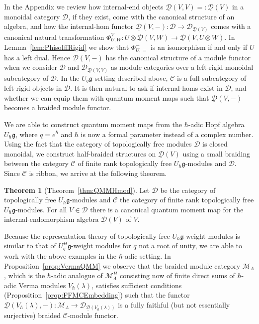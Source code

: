 \documentclass[12pt,dvipsnames]{article}
\numberwithin{equation}{section}
\theoremstyle{definition}
\newtheorem{theorem}[definition]{Theorem}
\newcommand{\cat}[1]{\mathcal{#1}}
\newcommand{\1}{\ensuremath{\mathbbm{1}}}
\newcommand{\blank}{{-}}
\newcommand{\bblank}{{=}}
\begin{document}
In the Appendix we review how internal-end objects $\underline{\cat{D}}(V,V) =: \underline{\cat{D}}(V)$ in a monoidal category $\cat{D}$, if they exist, come with the canonical structure of an algebra, and how the internal-hom functor $\underline{\cat{D}}(V,\blank):\cat{D} \to \cat{D}_{\underline{\cat{D}}(V)}$ comes with a canonical natural transformation $\Phi_{U,W}^V: U\otimes\underline{\cat{D}}(V,W)\to \underline{\cat{D}}(V,U\otimes W)$. In Lemma~\ref{lem:PhisoIffRigid} we show that $\Phi_{U,\bblank}^\blank$ is an isomorphism if and only if $U$ has a left dual. Hence $\underline{\cat{D}}(V,\blank)$ has the canonical structure of a module functor when we consider $\cat{D}$ and $\cat{D}_{\underline{\cat{D}}(V,V)}$ as module categories over a left-rigid monoidal subcategory of $\cat{D}$. In the $U_q\mathfrak{g}$ setting described above, $\cat{C}$ is a full subcategory of left-rigid objects in $\cat{D}$. It is then natural to ask if internal-homs exist in $\cat{D}$, and whether we can equip them with quantum moment maps such that $\underline{\cat{D}}(V,\blank)$ becomes a braided module functor. 

We are able to construct quantum moment maps from the $\hbar$-adic Hopf algebra $U_\hbar\mathfrak{g}$, where $q = e^\hbar$ 
and $\hbar$ is now a formal parameter instead of a complex number. Using the fact that the category of topologically free modules $\cat{D}$ is closed monoidal, we construct half-braided structures on $\underline{\cat{D}}(V)$
using a small braiding between the category $\cat{C}$ of finite rank topologically free $U_\hbar \mathfrak{g}$-modules and $\cat{D}$. Since $\cat{C}$ is ribbon, we arrive at the following theorem.
\begin{theorem}[Theorem~\ref{thm:QMMHmod}]
   Let $\cat{D}$ be the category of topologically free $U_\hbar\mathfrak{g}$-modules and $\cat{C}$ the category of finite rank topologically free $U_\hbar\mathfrak{g}$-modules. For all $V\in\cat{D}$ there is a canonical quantum moment map for the internal-endomorphism algebra $\underline{\cat{D}}(V)$ of $V$.
\end{theorem}
Because the representation theory of topologically free $U_\hbar\mathfrak{g}$-weight modules is similar to that of $U_q^H\mathfrak{g}$-weight modules for $q$ not a root of unity, we are able to work with the above examples in the $\hbar$-adic setting. In Proposition~\ref{prop:VermaQMM} we observe that the braided module category $\cat{M}_\Lambda$, which is the $\hbar$-adic analogue of $\cat{M}_\Lambda^H$ consisting now of finite direct sums of $\hbar$-adic Verma modules $V_\hbar(\lambda)$, satisfies sufficient conditions (Proposition~\ref{prop:FFMCEmbedding}) such that the functor $\underline{\cat{D}}(V_\hbar(\lambda),\blank):\cat{M}_\Lambda \to \cat{D}_{\underline{\cat{D}}(V_\hbar(\lambda))}$ is a fully faithful (but not essentially surjective) braided $\cat{C}$-module functor.
\end{document}
